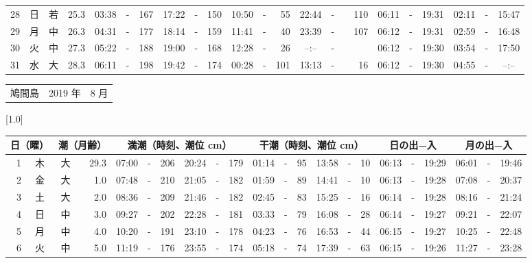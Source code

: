 \documentclass[12pt,a4j]{jsarticle}
\begin{document}
\begin{table}[htbp]
\begin{center}
{\begin{tabular}{|rc|cr|ccrccr|ccrccr|ccc|ccc|}
28 & 日 & 若 & 25.3 &  03:38 &-& 167 &  17:22 &-& 150 &  10:50 &-&  55 &  22:44 &-& 110 & 06:11 & -& 19:31 & 02:11 & -& 15:47 \\
29 & 月 & 中 & 26.3 &  04:31 &-& 177 &  18:14 &-& 159 &  11:41 &-&  40 &  23:39 &-& 107 & 06:12 & -& 19:31 & 02:59 & -& 16:48 \\
30 & 火 & 中 & 27.3 &  05:22 &-& 188 &  19:00 &-& 168 &  12:28 &-&  26 &  --:-- &-&~~~~~ & 06:12 & -& 19:30 & 03:54 & -& 17:50 \\
31 & 水 & 大 & 28.3 &  06:11 &-& 198 &  19:42 &-& 174 &  00:28 &-& 101 &  13:13 &-&  16 & 06:12 & -& 19:30 & 04:55 & -& --:-- \\
   \hline
   \end{tabular}}
   \end{center}
\end{table}
\newpage
 \begin{table}[htbp]
 \begin{center}
 \begin{tabular}{lcc}
 \LARGE{鳩間島}  & \large{2019 年} & \large{ 8 月} \\
 \end{tabular}
 \end{center}
 \begin{center}
    \scalebox{0.7}[1.0]{
    \begin{tabular}{|rc|cr|ccrccr|ccrccr|ccc|ccc|}
    \hline
    \multicolumn{2}{|c|}{日（曜）} & \multicolumn{2}{c|}{潮（月齢）} & \multicolumn{6}{c|}{満潮（時刻、潮位 cm）} & \multicolumn{6}{c|}{干潮（時刻、潮位 cm）} & \multicolumn{3}{c|}{日の出−入} &  \multicolumn{3}{c|}{月の出−入}\\
 \hline
 1 & 木 & 大 & 29.3 &  07:00 &-& 206 &  20:24 &-& 179 &  01:14 &-&  95 &  13:58 &-&  10 & 06:13 & -& 19:29 & 06:01 & -& 19:46 \\
 2 & 金 & 大 &  1.0 &  07:48 &-& 210 &  21:05 &-& 182 &  01:59 &-&  89 &  14:41 &-&  10 & 06:13 & -& 19:28 & 07:08 & -& 20:37 \\
 3 & 土 & 大 &  2.0 &  08:36 &-& 209 &  21:46 &-& 182 &  02:45 &-&  83 &  15:25 &-&  16 & 06:14 & -& 19:28 & 08:16 & -& 21:24 \\
 4 & 日 & 中 &  3.0 &  09:27 &-& 202 &  22:28 &-& 181 &  03:33 &-&  79 &  16:08 &-&  28 & 06:14 & -& 19:27 & 09:21 & -& 22:07 \\
 5 & 月 & 中 &  4.0 &  10:20 &-& 191 &  23:10 &-& 178 &  04:23 &-&  76 &  16:53 &-&  44 & 06:15 & -& 19:27 & 10:25 & -& 22:48 \\
 6 & 火 & 中 &  5.0 &  11:19 &-& 176 &  23:55 &-& 174 &  05:18 &-&  74 &  17:39 &-&  63 & 06:15 & -& 19:26 & 11:27 & -& 23:28 \\

\end{tabular}}
\end{center}
\end{table}
\end{document}
